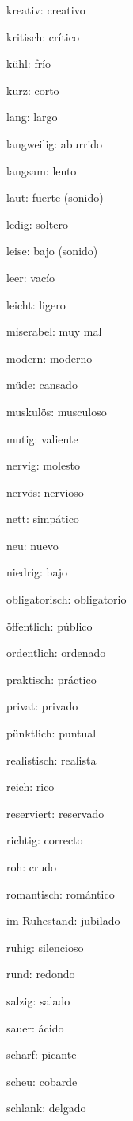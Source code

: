 \begin{multicols}{3}
\begin{myitemize}
\item kreativ: creativo
\item kritisch: crítico
\item kühl: frío
\item kurz: corto
\item lang: largo
\item langweilig: aburrido
\item langsam: lento
\item laut: fuerte (sonido)
\item ledig: soltero
\item leise: bajo (sonido)
\item leer: vacío
\item leicht: ligero
\item miserabel: muy mal
\item modern: moderno
\item müde: cansado
\item muskulös: musculoso
\item mutig: valiente
\item nervig: molesto
\item nervös: nervioso
\item nett: simpático
\item neu: nuevo
\item niedrig: bajo
\item obligatorisch: obligatorio
\item öffentlich: público
\item ordentlich: ordenado
\item praktisch: práctico
\item privat: privado
\item pünktlich: puntual
\item realistisch: realista
\item reich: rico
\item reserviert: reservado
\item richtig: correcto
\item roh: crudo
\item romantisch: romántico
\item im Ruhestand: jubilado
\item ruhig: silencioso
\item rund: redondo
\item salzig: salado
\item sauer: ácido
\item scharf: picante
\item scheu: cobarde
\item schlank: delgado

\end{myitemize}
\end{multicols}
